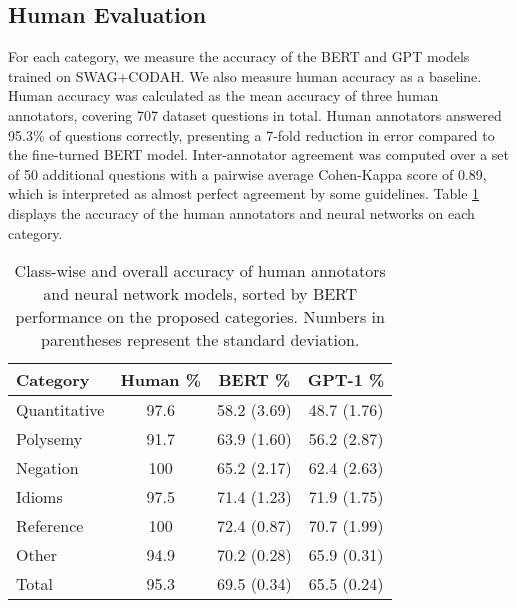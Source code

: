 \documentclass[11pt,a4paper]{article}
\begin{document}
    \subsection{Human Evaluation}
    For each category, we measure the accuracy of the BERT and GPT models trained on SWAG+CODAH. We also measure human accuracy as a baseline. Human accuracy was calculated as the mean accuracy of three human annotators, covering 707 dataset questions in total. Human annotators answered 95.3\% of questions correctly, presenting a 7-fold reduction in error compared to the fine-turned BERT model. Inter-annotator agreement was computed over a set of 50 additional questions with a pairwise average Cohen-Kappa score of 0.89, which is interpreted as almost perfect agreement by some guidelines. Table \ref{table:class_breakdown} displays the accuracy of the human annotators and neural networks on each category.
        
    \begin{table}[ht]
        \begin{center}
        \small
            \begin{tabular}{|l|c|c|c|}
            \hline \bf Category & \bf Human \% & \bf BERT \% & \bf GPT-1 \% \\ \hline\hline
                   Quantitative & 97.6         & 58.2 (3.69) & 48.7 (1.76) \\ \hline
                   Polysemy     & 91.7         & 63.9 (1.60) & 56.2 (2.87) \\ \hline
                   Negation     & 100          & 65.2 (2.17) & 62.4 (2.63) \\ \hline
                   Idioms       & 97.5         & 71.4 (1.23) & 71.9 (1.75) \\ \hline
                   Reference    & 100          & 72.4 (0.87) & 70.7 (1.99) \\ \hline
                   Other        & 94.9         & 70.2 (0.28) & 65.9 (0.31) \\ \hline\hline 
                   Total        & 95.3         & 69.5 (0.34) & 65.5 (0.24) \\ \hline
            \end{tabular}
        \end{center}
        \caption{\label{table:class_breakdown} Class-wise and overall accuracy of human annotators and neural network models, sorted by BERT performance on the proposed categories. Numbers in parentheses represent the standard deviation.}
    \end{table}
    
\end{document}
